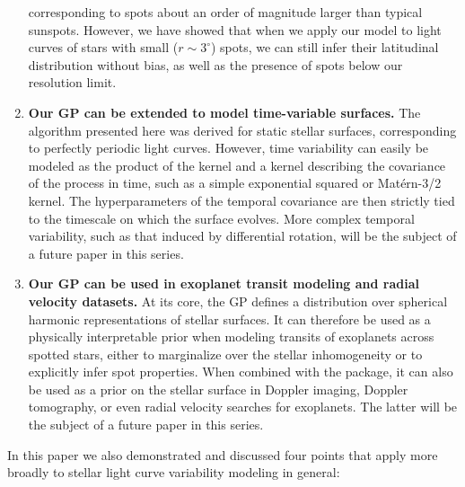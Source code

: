 \documentclass[modern]{aastex62}
\begin{document}
\begin{enumerate}
          corresponding to spots about an order of magnitude larger than typical
          sunspots. However, we have showed that when we apply our model to
          light curves of stars with small ($r \sim 3^\circ$) spots, we can
          still infer their latitudinal distribution without bias, as well as
          the presence of spots below our resolution limit.
    \item \textbf{Our GP can be extended to model time-variable surfaces.} The
          algorithm presented here was derived for static stellar surfaces,
          corresponding to perfectly periodic light curves. However, time
          variability can easily be modeled as the product of the \starryprocess
          kernel and a kernel describing the covariance of the process in
          time, such as a simple exponential squared or Mat\'ern-3/2 kernel.
          The hyperparameters of the temporal covariance are then strictly
          tied to the timescale on which the surface evolves. More
          complex temporal variability, such as that induced by differential
          rotation, will be the subject of a future paper in this series.
    \item \textbf{Our GP can be used in exoplanet transit modeling and
              radial velocity datasets.} At its core, the \starryprocess GP
          defines a distribution over spherical harmonic representations
          of stellar surfaces. It can therefore be used as a physically
          interpretable prior when modeling transits of exoplanets across
          spotted stars, either to marginalize over the stellar inhomogeneity
          or to explicitly infer spot properties. When combined with the
          \starry package, it can also be used as a
          prior on the stellar surface in Doppler imaging, Doppler tomography,
          or even radial velocity searches for exoplanets. The latter will
          be the subject of a future paper in this series.
\end{enumerate}

In this paper we also demonstrated and discussed four points that apply more
broadly to stellar light curve variability modeling in general:
\end{document}
